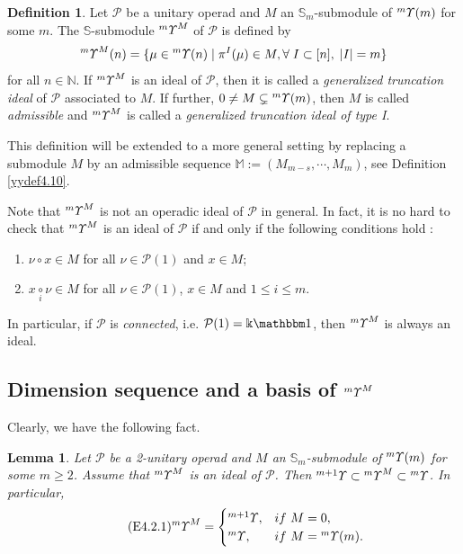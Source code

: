 \documentclass{amsart}
\newtheorem{lem}[thm]{Lemma}
\theoremstyle{definition}
\newtheorem{Def}[thm]{Definition}
\theoremstyle{remark}
\numberwithin{equation}{section}
\def\N{\mathbb{N}}
\def\S{\mathbb{S}}
\newcommand{\ucr}[1]{\underset{#1}{\circ}}
\newcommand{\up}[1]{{^{#1}{\it \!\Upsilon}}}
\def \ip{{\mathcal{P}}}
\def \1{\mathbbm 1}
\def \N{\mathbb{N}}
\def \S{\mathbb{S}}
\begin{document}
\begin{Def}
\label{yydef4.1}
Let $\ip$ be a unitary operad and $M$ an $\S_m$-submodule 
of $\up{m}(m)$ for some $m$. The $\S$-submodule 
$\up{m}^M$ of $\ip$ is defined by
\begin{align} 
\notag%
\up{m}^M(n)=\{\mu\in \up{m}(n)\mid \pi^I(\mu)\in M, 
\forall\; I\subset [n], \; |I|=m\}
\end{align}
for all $n\in \N$. If $\up{m}^M$ is an ideal
of $\ip$, then it is called a {\it generalized truncation ideal}
of $\ip$ associated to $M$. If further, $0\neq M\subsetneq 
\up{m}(m)$, then $M$ is called {\it admissible} and 
$\up{m}^M$ is called a {\it generalized truncation ideal of 
type I}.
\end{Def}

This definition will be extended to a more general setting
by replacing a submodule $M$ by an admissible sequence 
${\mathbb M}:=(M_{m-s},\cdots,M_{m})$, see Definition 
\ref{yydef4.10}. 


Note that $\up{m}^M$ is not an operadic  ideal of $\ip$ in general. 
In fact, it is no hard to check that  $\up{m}^M$ is an 
ideal of $\ip$ if and only if the following conditions hold 
\cite[Proposition 3.2]{BYZ}:
\begin{enumerate}
\item[(1)] 
$\nu\circ x\in M$ for all $\nu\in \ip(1)$ and $x\in M$;
\item[(2)]
$x\ucr{i} \nu\in M$ for all $\nu\in \ip(1)$, $x\in M$
and $1\le i\le m$. 
\end{enumerate} 
In particular, if $\ip$ is {\it connected}, i.e. $\ip(1)=\Bbbk\1$, 
then $\up{m}^M$ is always an ideal.


\subsection{Dimension sequence and a basis of $\up{m}^M$}
\label{yysec4.2}
Clearly, we have the following fact.

\begin{lem}
\label{yylem4.2}
Let $\ip$ be a 2-unitary operad and $M$ an $\S_m$-submodule 
of $\up{m}(m)$ for some $m\ge 2$. Assume that $\up{m}^M$ is 
an ideal of $\ip$. Then $\up{m+1}\subset \up{m}^M 
\subset \up{m}$. In particular, 
\begin{align}
\label{E4.2.1}\tag{E4.2.1}
\up{m}^M=\begin{cases}
\up{m+1}, & if \ M=0, \\
\up{m}, & if \ M=\up{m}(m).
\end{cases}
\end{align}
\end{lem} 
\end{document}
